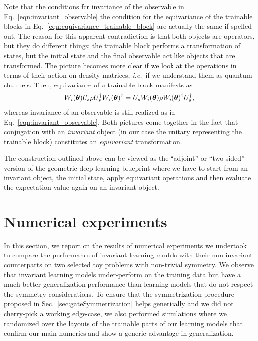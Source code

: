 \documentclass[a4paper,twocolumn,notitlepage,nofootinbib,superscriptaddress,floatfix]{revtex4-2}
\newcommand{\ie}{\textit{i.e.}\ }
\begin{document}
Note that the conditions for invariance of the observable in Eq.~\eqref{eqn:invariant_observable} the condition for the equivariance of the trainable blocks in Eq.~\eqref{eqn:equivariance_trainable_block} are actually the same if spelled out. The reason for this apparent contradiction is that both objects are operators, but they do different things: the trainable block performs a transformation of states, but the initial state and the final observable act like objects that are transformed. The picture becomes more clear if we look at the operations in terms of their action on density matrices, \ie if we understand them as quantum channels. Then, equivariance of a trainable block manifests as
\begin{align}
    W_i(\boldsymbol{\theta}) U_s \rho U_s^{\dagger} W_i(\boldsymbol{\theta})^{\dagger} = U_s W_i(\boldsymbol{\theta}) \rho W_i(\boldsymbol{\theta})^{\dagger} U_s^{\dagger},
\end{align}
whereas invariance of an observable is still realized as in Eq.~\eqref{eqn:invariant_observable}. Both pictures come together in the fact that conjugation with an \emph{invariant} object (in our case the unitary representing the trainable block) constitutes an \emph{equivariant} transformation. 

The construction outlined above can be viewed as the \enquote{adjoint} or \enquote{two-sided} version of the geometric deep learning blueprint where we have to start from an invariant object, the initial state, apply equivariant operations and then evaluate the expectation value again on an invariant object. 


\section{Numerical experiments}\label{sec:numerics}

In this section, we report on the results of numerical experiments we undertook to compare the performance of invariant learning models with their non-invariant counterparts on two selected toy problems with non-trivial symmetry. We observe that invariant learning models under-perform on the training data but have a much better generalization performance than learning models that do not respect the symmetry considerations. To ensure that the symmetrization procedure proposed in Sec.~\ref{sec:gateSymmetrization} helps generically and we did not cherry-pick a working edge-case, we also performed simulations where we randomized over the layouts of the trainable parts of our learning models that confirm our main numerics and show a generic advantage in generalization.
\end{document}
